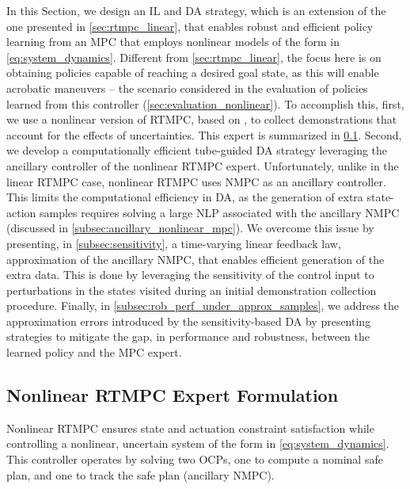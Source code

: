 In this Section, we design an \ac{IL} and \ac{DA} strategy, which is an extension of the one presented in \cref{sec:rtmpc_linear}, that enables robust and efficient policy learning from an \ac{MPC} that employs nonlinear models of the form in \cref{eq:system_dynamics}. Different from \cref{sec:rtmpc_linear}, the focus here is on obtaining policies capable of reaching a desired goal state, as this will enable acrobatic maneuvers -- the scenario considered in the evaluation of policies learned from this controller (\cref{sec:evaluation_nonlinear}). %
To accomplish this, first, we use a nonlinear version of \ac{RTMPC}, based on \cite{mayne2011tube}, to collect demonstrations that account for the effects of uncertainties. This expert is summarized in \cref{subsec:rtnmpc_expert}. Second, we develop a computationally efficient tube-guided \ac{DA} strategy leveraging the ancillary controller of the nonlinear \ac{RTMPC} expert. Unfortunately, unlike in the linear \ac{RTMPC} case, nonlinear \ac{RTMPC} \cite{mayne2011tube} uses \ac{NMPC} as an ancillary controller. This limits the computational efficiency in \ac{DA}, as the generation of extra state-action samples requires solving a large \ac{NLP} associated with the ancillary \ac{NMPC} (discussed in \cref{subsec:ancillary_nonlinear_mpc}). We overcome this issue by presenting, in \cref{subsec:sensitivity}, a time-varying linear feedback law, approximation of the ancillary \ac{NMPC}, that enables efficient generation of the extra data. This is done by leveraging the sensitivity of the control input to perturbations in the states visited during an initial demonstration collection procedure. 
Finally, in \cref{subsec:rob_perf_under_approx_samples}, we address the approximation errors introduced by the sensitivity-based \ac{DA} by presenting strategies to mitigate the gap, in performance and robustness, between the learned policy and the \ac{MPC} expert.


\subsection{Nonlinear RTMPC Expert Formulation} \label{subsec:rtnmpc_expert}
Nonlinear RTMPC \cite{mayne2011tube} ensures state and actuation constraint satisfaction while controlling a nonlinear, uncertain system of the form in \cref{eq:system_dynamics}. This controller operates by solving two \acp{OCP}, one to compute a nominal safe plan, and one to track the safe plan (ancillary \ac{NMPC}).

